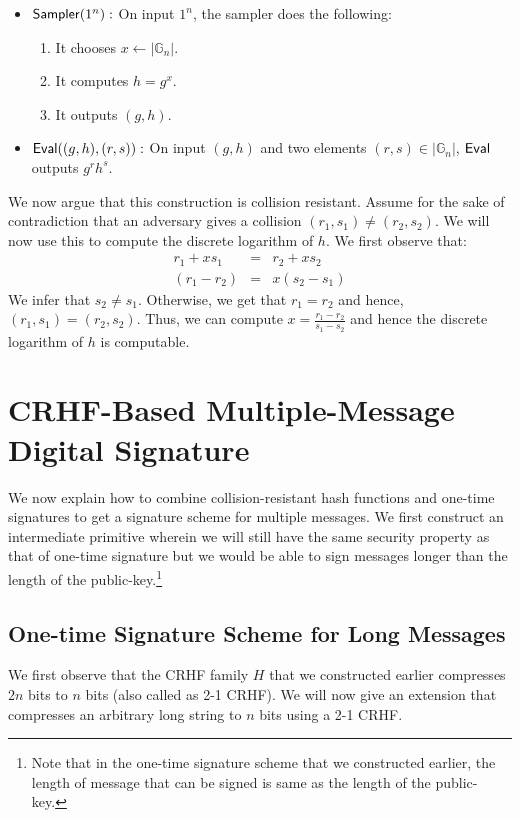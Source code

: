 \begin{itemize}
\item $\mathsf{Sampler}(1^n):$ On input $1^n$, the sampler does the following:
\begin{enumerate}
    \item It chooses $x \gets |\mathbb{G}_n|$.
    \item It computes $h = g^x$.
    \item It outputs $(g,h)$.

\end{enumerate}
\item $\mathsf{Eval}((g,h),(r,s)):$ On input $(g,h)$ and two elements $(r,s) \in |\mathbb{G}_n|$, $\mathsf{Eval}$ outputs $g^rh^s$.
\end{itemize}

We now argue that this construction is collision resistant. Assume for the sake of contradiction that an adversary gives a collision $(r_1,s_1) \neq (r_2,s_2)$. We will now use this to compute the discrete logarithm of $h$. We first observe that:
\begin{eqnarray*}
r_1+xs_1 &=& r_2 + xs_2\\
(r_1 - r_2) &=& x(s_2 - s_1)
\end{eqnarray*}
We infer that $s_2 \neq s_1$. Otherwise, we get that $r_1 = r_2$ and hence, $(r_1,s_1) = (r_2,s_2)$. Thus, we can compute $x = \frac{r_1-r_2}{s_1 - s_2}$ and hence the discrete logarithm of $h$ is computable.


\section{CRHF-Based Multiple-Message Digital Signature}

We now explain how to combine collision-resistant hash functions and one-time signatures to get a signature scheme for multiple messages. We first construct an intermediate primitive wherein we will still have the same security property as that of one-time signature but we would be able to sign messages longer than the length of the public-key.\footnote{Note that in the one-time signature scheme that we constructed earlier, the length of message that can be signed is same as the length of the public-key.}


\subsection{One-time Signature Scheme for Long Messages}
We first observe that the CRHF family $H$ that we constructed earlier compresses $2n$ bits to $n$ bits (also called as 2-1 CRHF). We will now give an extension that compresses an arbitrary long string to $n$ bits using a 2-1 CRHF.

